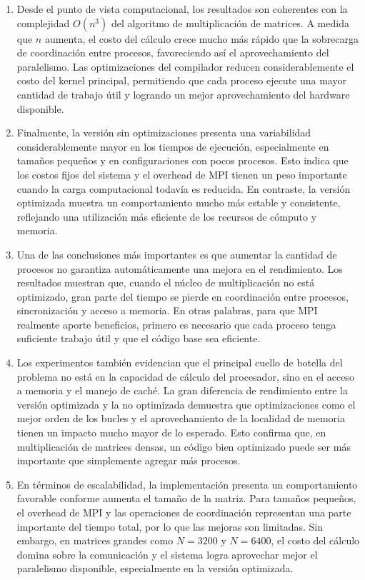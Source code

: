 \begin{enumerate}
    \item Desde el punto de vista computacional, los resultados son coherentes con la complejidad \(O(n^3)\) del algoritmo de multiplicación de matrices. A medida que \(n\) aumenta, el costo del cálculo crece mucho más rápido que la sobrecarga de coordinación entre procesos, favoreciendo así el aprovechamiento del paralelismo. Las optimizaciones del compilador reducen considerablemente el costo del kernel principal, permitiendo que cada proceso ejecute una mayor cantidad de trabajo útil y logrando un mejor aprovechamiento del hardware disponible.

    \item Finalmente, la versión sin optimizaciones presenta una variabilidad considerablemente mayor en los tiempos de ejecución, especialmente en tamaños pequeños y en configuraciones con pocos procesos. Esto indica que los costos fijos del sistema y el overhead de MPI tienen un peso importante cuando la carga computacional todavía es reducida. En contraste, la versión optimizada muestra un comportamiento mucho más estable y consistente, reflejando una utilización más eficiente de los recursos de cómputo y memoria.
    \item Una de las conclusiones más importantes es que aumentar la cantidad de procesos no garantiza automáticamente una mejora en el rendimiento. Los resultados muestran que, cuando el núcleo de multiplicación no está optimizado, gran parte del tiempo se pierde en coordinación entre procesos, sincronización y acceso a memoria. En otras palabras, para que MPI realmente aporte beneficios, primero es necesario que cada proceso tenga suficiente trabajo útil y que el código base sea eficiente.

    \item Los experimentos también evidencian que el principal cuello de botella del problema no está en la capacidad de cálculo del procesador, sino en el acceso a memoria y el manejo de caché. La gran diferencia de rendimiento entre la versión optimizada y la no optimizada demuestra que optimizaciones como el mejor orden de los bucles y el aprovechamiento de la localidad de memoria tienen un impacto mucho mayor de lo esperado. Esto confirma que, en multiplicación de matrices densas, un código bien optimizado puede ser más importante que simplemente agregar más procesos.

    \item En términos de escalabilidad, la implementación presenta un comportamiento favorable conforme aumenta el tamaño de la matriz. Para tamaños pequeños, el overhead de MPI y las operaciones de coordinación representan una parte importante del tiempo total, por lo que las mejoras son limitadas. Sin embargo, en matrices grandes como \(N = 3200\) y \(N = 6400\), el costo del cálculo domina sobre la comunicación y el sistema logra aprovechar mejor el paralelismo disponible, especialmente en la versión optimizada.

\end{enumerate}